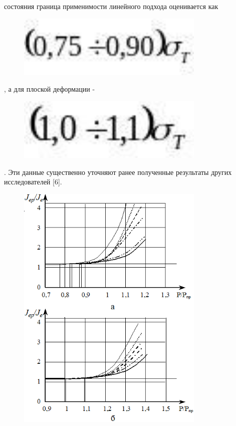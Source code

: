 состояния граница применимости линейного подхода оценивается как
\begin{figure}[H]
	\centering
	\includegraphics[width=0.8\textwidth]{assets/1146}
	\caption*{}
\end{figure}, а для плоской деформации -
\begin{figure}[H]
	\centering
	\includegraphics[width=0.8\textwidth]{assets/1147}
	\caption*{}
\end{figure}. Эти данные существенно уточняют
ранее полученные результаты других исследователей {[}6{]}.

\begin{figure}[H]
	\centering
	\includegraphics[width=0.8\textwidth]{assets/1148}
	\caption*{}
\end{figure}

